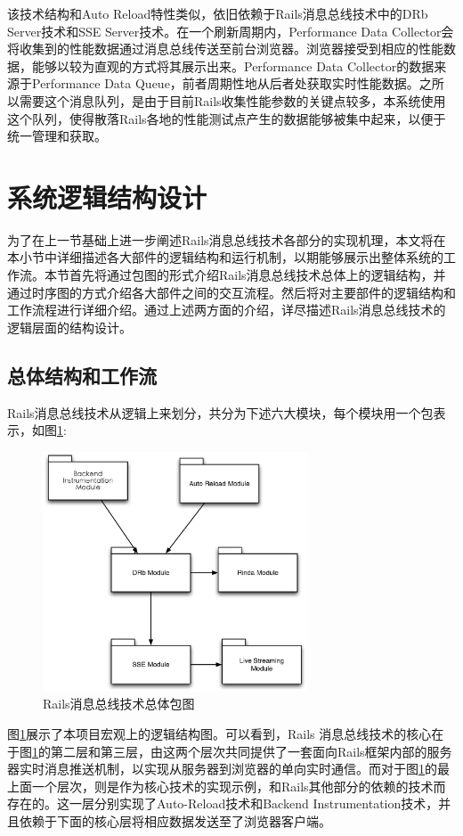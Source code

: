 该技术结构和Auto Reload特性类似，依旧依赖于Rails消息总线技术中的DRb Server技术和SSE Server技术。在一个刷新周期内，Performance Data Collector会将收集到的性能数据通过消息总线传送至前台浏览器。浏览器接受到相应的性能数据，能够以较为直观的方式将其展示出来。Performance Data Collector的数据来源于Performance Data Queue，前者周期性地从后者处获取实时性能数据。之所以需要这个消息队列，是由于目前Rails收集性能参数的关键点较多，本系统使用这个队列，使得散落Rails各地的性能测试点产生的数据能够被集中起来，以便于统一管理和获取。

\section{系统逻辑结构设计}
为了在上一节基础上进一步阐述Rails消息总线技术各部分的实现机理，本文将在本小节中详细描述各大部件的逻辑结构和运行机制，以期能够展示出整体系统的工作流。本节首先将通过包图的形式介绍Rails消息总线技术总体上的逻辑结构，并通过时序图的方式介绍各大部件之间的交互流程。然后将对主要部件的逻辑结构和工作流程进行详细介绍。通过上述两方面的介绍，详尽描述Rails消息总线技术的逻辑层面的结构设计。
\subsection{总体结构和工作流}
Rails消息总线技术从逻辑上来划分，共分为下述六大模块，每个模块用一个包表示，如图\ref{fig-overall}:

\begin{figure}[h]
\centering
\includegraphics[width=0.7\textwidth]{images/overview/overall_logic.eps}
\caption{Rails消息总线技术总体包图}
\label{fig-overall}
\end{figure}

图\ref{fig-overall}展示了本项目宏观上的逻辑结构图。可以看到，Rails 消息总线技术的核心在于图\ref{fig-overall}的第二层和第三层，由这两个层次共同提供了一套面向Rails框架内部的服务器实时消息推送机制，以实现从服务器到浏览器的单向实时通信。而对于图\ref{fig-overall}的最上面一个层次，则是作为核心技术的实现示例，和Rails其他部分的依赖的技术而存在的。这一层分别实现了Auto-Reload技术和Backend Instrumentation技术，并且依赖于下面的核心层将相应数据发送至了浏览器客户端。


